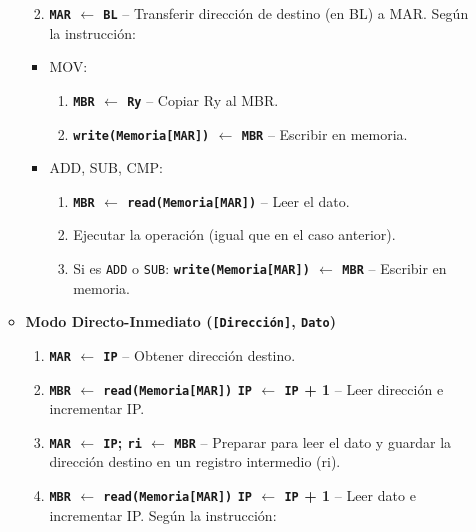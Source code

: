 \documentclass[12pt,oneside]{templates/unerthesis}
\providecommand{\tightlist}{%
  \setlength{\itemsep}{0pt}\setlength{\parskip}{0pt}}
\begin{document}
\begin{itemize}
\begin{itemize}
    \begin{enumerate}
    \def\labelenumi{\arabic{enumi}.}
    \setcounter{enumi}{3}
    \tightlist
    \item
      \textbf{\texttt{MAR} \(\leftarrow\) \texttt{BL}} -- Transferir dirección de destino (en BL) a MAR.
      Según la instrucción:
    \end{enumerate}

    \begin{itemize}
    \tightlist
    \item
      MOV:

      \begin{enumerate}
      \def\labelenumi{\arabic{enumi}.}
      \setcounter{enumi}{4}
      \tightlist
      \item
        \textbf{\texttt{MBR} \(\leftarrow\) \texttt{Ry}} -- Copiar Ry al MBR.
      \item
        \textbf{\texttt{write(Memoria{[}MAR{]})} \(\leftarrow\) \texttt{MBR}} -- Escribir en memoria.
      \end{enumerate}
    \item
      ADD, SUB, CMP:

      \begin{enumerate}
      \def\labelenumi{\arabic{enumi}.}
      \setcounter{enumi}{4}
      \tightlist
      \item
        \textbf{\texttt{MBR} \(\leftarrow\) \texttt{read(Memoria{[}MAR{]})}} -- Leer el dato.
      \item
        Ejecutar la operación (igual que en el caso anterior).
      \item
        Si es \texttt{ADD} o \texttt{SUB}: \textbf{\texttt{write(Memoria{[}MAR{]})} \(\leftarrow\) \texttt{MBR}} -- Escribir en memoria.
      \end{enumerate}
    \end{itemize}
  \item
    \textbf{Modo Directo-Inmediato (\texttt{{[}Dirección{]}}, \texttt{Dato})}

    \begin{enumerate}
    \def\labelenumi{\arabic{enumi}.}
    \setcounter{enumi}{3}
    \tightlist
    \item
      \textbf{\texttt{MAR} \(\leftarrow\) \texttt{IP}} -- Obtener dirección destino.
    \item
      \textbf{\texttt{MBR} \(\leftarrow\) \texttt{read(Memoria{[}MAR{]})} \textbar{} \texttt{IP} \(\leftarrow\) \texttt{IP} + 1} -- Leer dirección e incrementar IP.
    \item
      \textbf{\texttt{MAR} \(\leftarrow\) \texttt{IP}; \texttt{ri} \(\leftarrow\) \texttt{MBR}} -- Preparar para leer el dato y guardar la dirección destino en un registro intermedio (ri).
    \item
      \textbf{\texttt{MBR} \(\leftarrow\) \texttt{read(Memoria{[}MAR{]})} \textbar{} \texttt{IP} \(\leftarrow\) \texttt{IP} + 1} -- Leer dato e incrementar IP.
      Según la instrucción:
    \end{enumerate}


\end{itemize}
\end{itemize}
\end{document}
